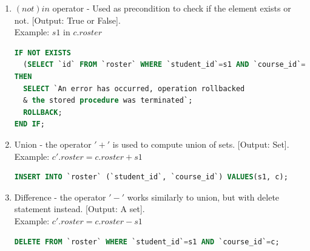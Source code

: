 \documentclass[oneside]{book}
\begin{document}
\begin{enumerate}
\item $(not) in$ operator - Used as precondition to check if the element exists or not. [Output: True or False]. \\
Example: $s1$ in $c.roster$

\begin{lstlisting}[escapechar=@,language=SQL]
IF NOT EXISTS 
  (SELECT `id` FROM `roster` WHERE `student_id`=s1 AND `course_id`=c) 
THEN
  SELECT `An error has occurred, operation rollbacked 
  & the stored procedure was terminated`;
  ROLLBACK;
END IF;
\end{lstlisting}

\item Union - the operator $'+'$ is used to compute union of sets. [Output: Set].\\
Example: $c'.roster = c.roster + s1$

\begin{lstlisting}[escapechar=@,language=SQL]
INSERT INTO `roster` (`student_id`, `course_id`) VALUES(s1, c);
\end{lstlisting}

\item Difference - the operator $'-'$ works similarly to union, but with delete statement instead. [Output: A set].\\
Example: $c'.roster = c.roster - s1$

\begin{lstlisting}[escapechar=@,language=SQL]
DELETE FROM `roster` WHERE `student_id`=s1 AND `course_id`=c;
\end{lstlisting}


\end{enumerate}
\end{document}
